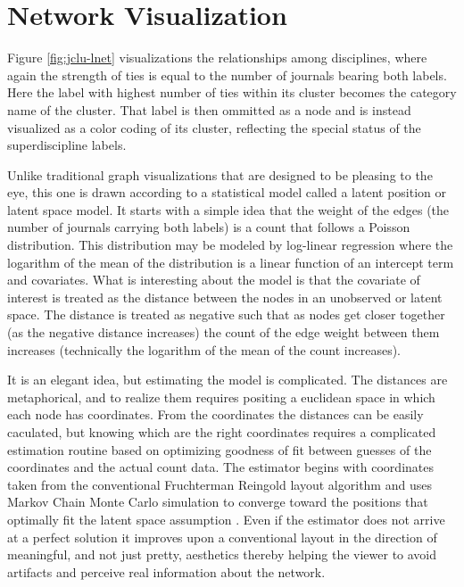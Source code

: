\documentclass[]{book}
\theoremstyle{definition}
\theoremstyle{definition}
\theoremstyle{definition}
\theoremstyle{remark}
\begin{document}
\hypertarget{network-visualization}{%
\section{Network Visualization}\label{network-visualization}}

Figure \ref{fig:jclu-lnet} visualizations the relationships among
disciplines, where again the strength of ties is equal to the number of
journals bearing both labels. Here the label with highest number of ties
within its cluster becomes the category name of the cluster. That label
is then ommitted as a node and is instead visualized as a color coding
of its cluster, reflecting the special status of the superdiscipline
labels.

Unlike traditional graph visualizations that are designed to be pleasing
to the eye, this one is drawn according to a statistical model called a
latent position or latent space model. It starts with a simple idea that
the weight of the edges (the number of journals carrying both labels) is
a count that follows a Poisson distribution. This distribution may be
modeled by log-linear regression where the logarithm of the mean of the
distribution is a linear function of an intercept term and covariates.
What is interesting about the model is that the covariate of interest is
treated as the distance between the nodes in an unobserved or latent
space. The distance is treated as negative such that as nodes get closer
together (as the negative distance increases) the count of the edge
weight between them increases (technically the logarithm of the mean of
the count increases).

It is an elegant idea, but estimating the model is complicated. The
distances are metaphorical, and to realize them requires positing a
euclidean space in which each node has coordinates. From the coordinates
the distances can be easily caculated, but knowing which are the right
coordinates requires a complicated estimation routine based on
optimizing goodness of fit between guesses of the coordinates and the
actual count data. The estimator begins with coordinates taken from the
conventional Fruchterman Reingold layout algorithm and uses Markov Chain
Monte Carlo simulation to converge toward the positions that optimally
fit the latent space assumption \citep[See][ for details of the model,
estimation, and software]{Krivitsky2008Fitting}. Even if the estimator
does not arrive at a perfect solution it improves upon a conventional
layout in the direction of meaningful, and not just pretty, aesthetics
thereby helping the viewer to avoid artifacts and perceive real
information about the network.
\end{document}

